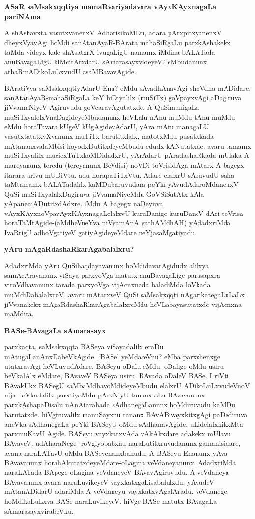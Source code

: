 \textbf{ASaR saMsakxqqtiya mamaRvariyadavara vAyxKAyxnagaLa pariNAma}

A shAshavxta vasutxvanenxV AdharisikoMDu, adara pArxpitxyanenxV dheyxVyavAgi hoMdi sanAtanAyaR-BArata mahaSiRgaLu parxkAshakekx taMda videyx-kale-shAsatxrX ivugaLigU namamx iMdina bALATada anuBavagaLigU kiMcitAtxdarU sAmarasayxvideyeV? eMbudanunx athaRmADikoLuLxvudU asaMBavavAgide.

BAratiVya saMsakxqqtiyAdarU Enu? eMdu sAvadhAnavAgi shoVdha mADidare, sanAtanAyaR-mahaSiRgaLa keY hiDiyalilx (muSiTx) goVpayxvAgi aDagiruva jiVvamaNiyeV Agiruvudu goVcaravAgutatxde. A QuSimunigaLa muSiTxyalelxVnaDagideyeMbudanunx heVLalu nAnu muMdu tAnu muMdu eMdu horaTavara kUgeV kUgAgideyAdarU, yAra mAtu managaLU vasutxtatatxvXvanunx muTiTx barutitxlalx, matotxMdu pusatxkada mAtananxvalaMbisi hoyodxDutitxdeyeMbudu edudx kANutatxde. avaru tamamx muSiTxyalilx mucicxTuTxkoMDidadxrU, yArAdarU pAradashaRkada mUlaka A mareyanunx teredu (tereyanunx BeVdisi) noVDi toVrisidAga mAtarx A bagegx itarara arivu mUDiVtu. adu horapaTiTxVtu. Adare elalxrU sAruvudU saha taMtamamx bALATadalilx kaMDubaruvudara peYki yAvudAdaroMdanenxV QuSi muSiTxyalalxDagiruva jiVvamaNiyeMdu GoVSiSutAtx kAla yApanemADutitxdAdxre. iMdu A bagegx naDeyuva vAyxKAyxnoVpavAyxKAyxnagaLelalxvU kuruDanige kuruDaneV dAri toVrisa horaTaMtAgide-(aMdheVneYva niVyamAnA yathAMdhAH) yAdadxriMda IvaRrigU adhoVgatiyeV gatiyAgideyeMdare neYjasaMgatiyadu.

\textbf{yAru mAgaRdashaRkarAgabalalxru?}

 AdadxriMda yAru QuSihaqdayavanunx hoMdidavarAgidudx alilxya samAcAravanunx viSaya-parxyoVga matutx anuBavagaLige parasapxra viroVdhavanunx tarada parxyoVga vijAcnxnada baladiMda loVkada muMdiDabalalxroV, avaru mAtarxveV QuSi saMsakxqqti nAgarikategaLuLaLx jiVvanakekx mAgaRdashaRkarAgabalalxreMdu heVLabayasutatxde vijAcnxna maMdira.

\textbf{BASe-BAvagaLa sAmarasayx}

parxkaqta, saMsakxqqta BASeya viSayadalilx eraDu mAtugaLanAnxDabeVkAgide. `BASe' yeMdareVnu? eMba parxshenxge utatxravAgi heVLuvudAdare, BASeyu oDalu-eMdu. oDalige oMdu usiru beVkalAlx eMdare, BAvaveV BASeya usiru. BAvada oDaleV BASe. I riVti BAvakUkx BASegU saMbaMdhavoMdideyeMbudu elalxrU ADikoLuLxvudeVnoV nija. loVkadalilx parxtiyoMdu pArxNiyU tananx oLa BAvavanunx parxkAshapaDisalu nAnAtarahada sAdhanegaLanunx hoMdiruvudu kaMDu barutatxde. hiVgiruvalilx manuSayxnu tananx BAvABivayxkitxgAgi paDediruva aneVka sAdhanegaLa peYki BASeyU oMdu sAdhanavAgide. uLidelalxkikxMta parxmuKavU Agide. BASeyu vayxkatxvAda vAkAkxdare adakekx mUlavu BAvaveV. udAharaNege- roVgiyobabxnu naraLutitxruvudanunx gamanisidare, avana naraLATavU oMdu BASeyenanxbahudu. A BASeyu Enanunx-yAva BAvavanunx horahAkutatxdeyeMdare-oLagina veVdaneyanunx. AdadxriMda naraLATada BApege oLagina veVdaneyeV BAvavAgiruvudu. A veVdaneya BAvavanunx avana naraLuvikeyeV vayxkatxgoLisabalulxdu. yAvudeV mAtanADidarU adariMda A veVdaneyu vayxkatxvAgalAradu. veVdanege hoMdikoLuLxva BASe naraLuvikeyeV. hiVge BASe matutx BAvagaLa sAmarasayxvirabeVku.

